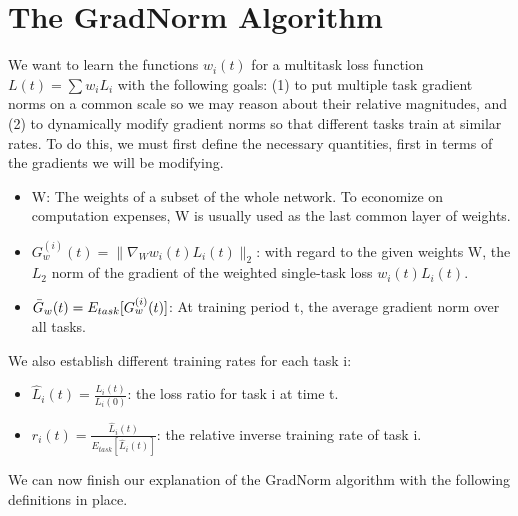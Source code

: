 \documentclass{article}
\begin{document}
\section{The GradNorm Algorithm}
We want to learn the functions $w_i(t)$ for a multitask loss function $L(t) = \sum w_iL_i$ with the following goals: (1) to put multiple task gradient norms on a common scale so we may reason about their relative magnitudes, and (2) to dynamically modify gradient norms so that different tasks train at similar rates. To do this, we must first define the necessary quantities, first in terms of the gradients we will be modifying.
\begin{itemize}
\item W: The weights of a subset of the whole network. To economize on computation expenses, W is usually used as the last common layer of weights.
\item $G^{(i)}_w(t) = 	\lVert \nabla_Ww_i(t)L_i(t)\lVert_2$: with regard to the given weights W, the $L_2$ norm of the gradient of the weighted single-task loss $w_i(t)L_i(t)$.
\item $\Bar{G}_w(t) = E_{task}[G^{(i)}_w(t)] $: At training period t, the average gradient norm over all tasks. 
\end{itemize}
We also establish different training rates for each task i:
\begin{itemize}
    \item $\hat{L}_i(t) = \frac{L_i(t)}{L_i(0)} $: the loss ratio for task i at time t.
    \item $r_i(t)= \frac{\hat{L}_i(t)}{E_{task}[\hat{L}_i(t)]}$: the relative inverse training rate of task i.
\end{itemize}
We can now finish our explanation of the GradNorm algorithm with the following definitions in place.
\end{document}
